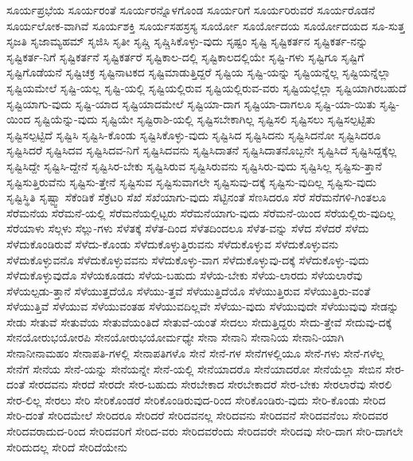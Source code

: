 {ಸೂರ್ಯಪ್ರಭೆಯ
ಸೂರ್ಯರಂತೆ
ಸೂರ್ಯರನ್ನೊಳಗೊಂಡ
ಸೂರ್ಯರಿಗೆ
ಸೂರ್ಯರಿರುವರೆ
ಸೂರ್ಯರೊಡನೆ
ಸೂರ್ಯಲೋಕ-ವಾಗಿವೆ
ಸೂರ್ಯಶಕ್ತಿ
ಸೂರ್ಯಸಹಸ್ರಸ್ಯ
ಸೂರ್ಯೋ
ಸೂರ್ಯೋದಯ
ಸೂರ್ಯೋದಯದ
ಸೂ-ಸುತ್ತ
ಸೃಜತಿ
ಸೃಜಾಮ್ಯಹಮ್
ಸೃಜಿಸಿ
ಸೃತೀ
ಸೃಷ್ಚಿ
ಸೃಷ್ಚಿಸಿಕೊಳ್ಳು-ವುದು
ಸೃಷ್ಟಂ
ಸೃಷ್ಟಿ
ಸೃಷ್ಟಿಕರ್ತನ
ಸೃಷ್ಟಿಕರ್ತ-ನನ್ನು
ಸೃಷ್ಟಿಕರ್ತ-ನಿಗೆ
ಸೃಷ್ಟಿಕರ್ತನೆ
ಸೃಷ್ಟಿಕರ್ತರೆ
ಸೃಷ್ಟಿಕಾಲ-ದಲ್ಲಿ
ಸೃಷ್ಟಿಕಾಲದಲ್ಲಿಯೇ
ಸೃಷ್ಟಿ-ಗಳು
ಸೃಷ್ಟಿಗೂ
ಸೃಷ್ಟಿಗೆ
ಸೃಷ್ಟಿಗೊಡೆಯನೆ
ಸೃಷ್ಟಿಚಕ್ರ
ಸೃಷ್ಟಿನಾಟಕದ
ಸೃಷ್ಟಿಮಾಡುತ್ತಿದ್ದರೆ
ಸೃಷ್ಟಿಯ
ಸೃಷ್ಟಿ-ಯನ್ನು
ಸೃಷ್ಟಿಯನ್ನೆಲ್ಲ
ಸೃಷ್ಟಿಯನ್ನೆಲ್ಲಾ
ಸೃಷ್ಟಿಯಮೇಲೆ
ಸೃಷ್ಟಿ-ಯಲ್ಲ
ಸೃಷ್ಟಿ-ಯಲ್ಲಿ
ಸೃಷ್ಟಿಯಲ್ಲಿರುವ
ಸೃಷ್ಟಿಯಲ್ಲಿರುವ-ವರು
ಸೃಷ್ಟಿಯಲ್ಲೆಲ್ಲಾ
ಸೃಷ್ಟಿಯಾಗಿರಬಹುದೆ
ಸೃಷ್ಟಿಯಾಗು-ವುದು
ಸೃಷ್ಟಿ-ಯಾದ
ಸೃಷ್ಟಿಯಾದಮೇಲೆ
ಸೃಷ್ಟಿಯಾ-ದಾಗ
ಸೃಷ್ಟಿಯಾ-ದಾಗಲೂ
ಸೃಷ್ಟಿ-ಯಾ-ಯಿತು
ಸೃಷ್ಟಿ-ಯಿಂದ
ಸೃಷ್ಟಿಯೆನ್ನು-ವುದು
ಸೃಷ್ಟಿಯೇ
ಸೃಷ್ಟಿರಾಶಿ-ಯಲ್ಲಿ
ಸೃಷ್ಟಿಸಬೇಕಾಗಿಲ್ಲ
ಸೃಷ್ಟಿಸಲಿ
ಸೃಷ್ಟಿಸಲು
ಸೃಷ್ಟಿಸಲ್ಪಟ್ಟಿತು
ಸೃಷ್ಟಿಸಲ್ಪಟ್ಟಿದೆ
ಸೃಷ್ಟಿಸಿ
ಸೃಷ್ಟಿಸಿ-ಕೊಂಡು
ಸೃಷ್ಟಿಸಿಕೊಳ್ಳು-ವುದು
ಸೃಷ್ಟಿಸಿದ
ಸೃಷ್ಟಿಸಿದನು
ಸೃಷ್ಟಿಸಿದನೋ
ಸೃಷ್ಟಿಸಿದರೂ
ಸೃಷ್ಟಿಸಿದರೆ
ಸೃಷ್ಟಿಸಿದವ
ಸೃಷ್ಟಿಸಿದವ-ನಿಗೆ
ಸೃಷ್ಟಿಸಿದವನು
ಸೃಷ್ಟಿಸಿದಾತನೆ
ಸೃಷ್ಟಿಸಿದಾತನೊಬ್ಬನೇ
ಸೃಷ್ಟಿಸಿದೆ
ಸೃಷ್ಟಿಸಿದ್ದಕ್ಕೆಲ್ಲ
ಸೃಷ್ಟಿಸಿದ್ದೇ
ಸೃಷ್ಟಿಸಿ-ದ್ದೇನೆ
ಸೃಷ್ಟಿಸಿರ-ಬೇಕು
ಸೃಷ್ಟಿಸಿರುವ
ಸೃಷ್ಟಿಸಿರುವನು
ಸೃಷ್ಟಿಸಿರು-ವುದು
ಸೃಷ್ಟಿಸಿಲ್ಲ
ಸೃಷ್ಟಿಸು-ತ್ತಾನೆ
ಸೃಷ್ಟಿಸುತ್ತಿರುವೆನು
ಸೃಷ್ಟಿಸು-ತ್ತೇನೆ
ಸೃಷ್ಟಿಸುವ
ಸೃಷ್ಟಿಸುವಾಗಲೇ
ಸೃಷ್ಟಿಸುವು-ದಕ್ಕೆ
ಸೃಷ್ಟಿಸು-ವುದಿಲ್ಲ
ಸೃಷ್ಟಿಸು-ವುದು
ಸೃಷ್ಟಿಸ್ಥಿತಿ
ಸೃಷ್ಟ್ವಾ
ಸೆಕೆಂಡಿಕೆ
ಸೆಕ್ರೆಟರಿ
ಸೆಖೆ
ಸೆಖೆಯಾಗು-ವುದು
ಸೆಟ್ಟಿನಂತೆ
ಸೆಣಸಿದರೂ
ಸೆರೆ
ಸೆರೆಮನೆಗಳಿ-ಗಿಂತಲೂ
ಸೆರೆಮನೆಯ
ಸೆರೆಮನೆ-ಯಲ್ಲಿ
ಸೆರೆಮನೆಯಲ್ಲಿಟ್ಟರು
ಸೆರೆಮನೆಯಾಗು-ವುದು
ಸೆರೆಮನೆ-ಯಿಂದ
ಸೆರೆಯಲ್ಲಿರು-ವುದಿಲ್ಲ
ಸೆರೆಯಾಳು
ಸೆಲ್ಗಳು
ಸೆಲ್ಲು-ಗಳು
ಸೆಳೆತಕ್ಕೆ
ಸೆಳೆತ-ದಿಂದ
ಸೆಳೆತದಿಂದಲೂ
ಸೆಳೆತ-ವನ್ನು
ಸೆಳೆದ
ಸೆಳೆದರೆ
ಸೆಳೆದು
ಸೆಳೆದುಕೊಂಡಿರುವೆ
ಸೆಳೆದು-ಕೊಂಡು
ಸೆಳೆದುಕೊಳ್ಳುತ್ತಿರುವನು
ಸೆಳೆದುಕೊಳ್ಳುವ
ಸೆಳೆದುಕೊಳ್ಳುವನು
ಸೆಳೆದುಕೊಳ್ಳುವನೊ
ಸೆಳೆದುಕೊಳ್ಳುವವನು
ಸೆಳೆದುಕೊಳ್ಳು-ವಾಗ
ಸೆಳೆದುಕೊಳ್ಳುವು-ದಕ್ಕೆ
ಸೆಳೆದುಕೊಳ್ಳು-ವುದು
ಸೆಳೆದುಕೊಳ್ಳುವುದೊ
ಸೆಳೆಯಕೂಡದು
ಸೆಳೆಯ-ಬಹುದು
ಸೆಳೆಯ-ಬೇಕು
ಸೆಳೆಯ-ಲಾರದು
ಸೆಳೆಯಲಾರೆವು
ಸೆಳೆಯಲ್ಪಡು-ತ್ತಾನೆ
ಸೆಳೆಯುತ್ತದೆಯೊ
ಸೆಳೆಯು-ತ್ತವೆ
ಸೆಳೆಯುತ್ತಿದೆಯೊ
ಸೆಳೆಯುತ್ತಿರುವ
ಸೆಳೆಯುತ್ತಿರು-ವಂತೆ
ಸೆಳೆಯುತ್ತಿವೆ
ಸೆಳೆಯುವ
ಸೆಳೆಯುವಂತಹ
ಸೆಳೆಯುವದಿಲ್ಲವೇ
ಸೆಳೆಯು-ವುದು
ಸೆಳೆಯುವುದೇ
ಸೆಳೆಯುವುವು
ಸೇಡನ್ನು
ಸೇಡು
ಸೇತುವೆ
ಸೇತುವೆಯ
ಸೇತುವೆಯಂತಿದೆ
ಸೇತುವೆ-ಯಂತೆ
ಸೇದಲು
ಸೇದುತ್ತಿದ್ದರು
ಸೇದು-ತ್ತೇವೆ
ಸೇದುವು-ದಕ್ಕೆ
ಸೇನಯೋರುಭಯೋರಪಿ
ಸೇನಯೋರುಭಯೋರ್ಮಧ್ಯೇ
ಸೇನಾ
ಸೇನಾನಿ
ಸೇನಾನಿಯ
ಸೇನಾನಿ-ಯಾಗಿ
ಸೇನಾನೀನಾಮಹಂ
ಸೇನಾಪತಿ-ಗಳಲ್ಲಿ
ಸೇನಾಪತಿಗಳೊ
ಸೇನೆ
ಸೇನೆ-ಗಳ
ಸೇನೆಗಳಲ್ಲಿಯೂ
ಸೇನೆ-ಗಳು
ಸೇನೆ-ಗಳೆಲ್ಲ
ಸೇನೆಗೆ
ಸೇನೆಯ
ಸೇನೆ-ಯನ್ನು
ಸೇನೆಯನ್ನೇ
ಸೇನೆ-ಯಲ್ಲಿ
ಸೇನೆಯಾದರೊ
ಸೇನೆಯಾದರೋ
ಸೇನೆಯೆಲ್ಲಾ
ಸೇಬಿನ
ಸೇರ-ದಂತೆ
ಸೇರದವನು
ಸೇರದೆ
ಸೇರದೇ
ಸೇರ-ಬಹುದು
ಸೇರಬೇಕಾದ
ಸೇರಬೇಕಾದರೆ
ಸೇರ-ಬೇಕು
ಸೇರಲಾರೆವು
ಸೇರಲಿ
ಸೇರ-ಲಿಲ್ಲ
ಸೇರಲು
ಸೇರಿ
ಸೇರಿಕೊಂಡರೆ
ಸೇರಿಕೊಂಡಿರುವುದ-ರಿಂದ
ಸೇರಿಕೊಂಡಿರು-ವುದು
ಸೇರಿ-ಕೊಂಡು
ಸೇರಿದ
ಸೇರಿ-ದಂತೆ
ಸೇರಿದಮೇಲೆ
ಸೇರಿದರೂ
ಸೇರಿದರೆ
ಸೇರಿದವನಲ್ಲ
ಸೇರಿದವನು
ಸೇರಿದವನೆ
ಸೇರಿದವನೆಂಬ
ಸೇರಿದವರ
ಸೇರಿದವರಾದುದ-ರಿಂದ
ಸೇರಿದವರಿಗೆ
ಸೇರಿದ-ವರು
ಸೇರಿದವರೆಂದು
ಸೇರಿದವರೇ
ಸೇರಿದವು
ಸೇರಿ-ದಾಗ
ಸೇರಿ-ದಾಗಲೇ
ಸೇರಿದುದಲ್ಲ
ಸೇರಿದೆ
ಸೇರಿದೆಯೇನು
}
